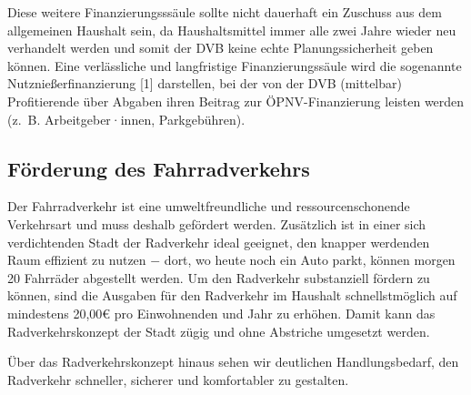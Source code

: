 \documentclass[a4paper, 11pt]{article}
\begin{document}
Diese weitere Finanzierungsssäule sollte nicht dauerhaft ein Zuschuss aus dem allgemeinen Haushalt sein, da Haushaltsmittel immer alle zwei Jahre wieder neu verhandelt werden und somit der DVB keine echte Planungssicherheit geben können. Eine verlässliche und langfristige Finanzierungssäule wird die sogenannte Nutznießerfinanzierung [1] darstellen, bei der von der DVB (mittelbar) Profitierende über Abgaben ihren Beitrag zur ÖPNV-Finanzierung leisten werden (z. B. Arbeitgeber·innen, Parkgebühren).



\subsection{Förderung des Fahrradverkehrs}
Der Fahrradverkehr ist eine umweltfreundliche und ressourcenschonende Verkehrsart und muss deshalb gefördert werden. Zusätzlich ist in einer sich verdichtenden Stadt der Radverkehr ideal geeignet, den knapper werdenden Raum effizient zu nutzen $-$ dort, wo heute noch ein Auto parkt, können morgen 20 Fahrräder abgestellt werden. Um den Radverkehr substanziell fördern zu können, sind die Ausgaben für den Radverkehr im Haushalt schnellstmöglich auf mindestens 20,00€ pro Einwohnenden und Jahr zu erhöhen. Damit kann das Radverkehrskonzept der Stadt zügig und ohne Abstriche umgesetzt werden.\newline

Über das Radverkehrskonzept hinaus sehen wir deutlichen Handlungsbedarf, den Radverkehr schneller, sicherer und komfortabler zu gestalten.
\end{document}
